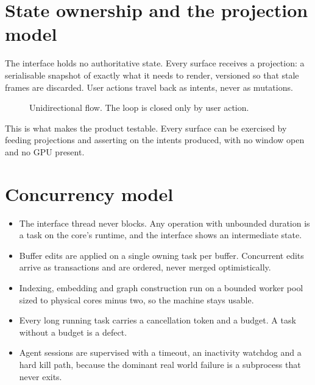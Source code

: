 \section{State ownership and the projection model}

The interface holds no authoritative state. Every surface receives a projection: a
serialisable snapshot of exactly what it needs to render, versioned so that stale frames are
discarded. User actions travel back as intents, never as mutations.

\begin{figure}[h]
\centering
{}
\caption{Unidirectional flow. The loop is closed only by user action.}
\end{figure}

This is what makes the product testable. Every surface can be exercised by feeding
projections and asserting on the intents produced, with no window open and no GPU present.

\section{Concurrency model}

\begin{itemize}
  \item The interface thread never blocks. Any operation with unbounded duration is a task
  on the core's runtime, and the interface shows an intermediate state.
  \item Buffer edits are applied on a single owning task per buffer. Concurrent edits arrive
  as transactions and are ordered, never merged optimistically.
  \item Indexing, embedding and graph construction run on a bounded worker pool sized to
  physical cores minus two, so the machine stays usable.
  \item Every long running task carries a cancellation token and a budget. A task without a
  budget is a defect.
  \item Agent sessions are supervised with a timeout, an inactivity watchdog and a hard kill
  path, because the dominant real world failure is a subprocess that never exits.
\end{itemize}

